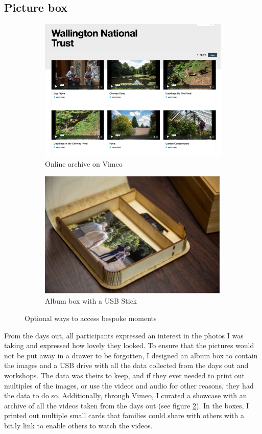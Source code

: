 \subsection{Picture box}
\label{PictureBox}

\begin{figure}[htp]
\centering
\begin{subfigure}{.5\textwidth}
  \centering
  \includegraphics[width=.8\linewidth]{Images/ChapterFour/VimeoWebsite.png}
  \caption{Online archive on Vimeo}
  \label{fig:onlineArchive}
\end{subfigure}%
\begin{subfigure}{.5\textwidth}
  \centering
  \includegraphics[width=.8\linewidth]{Images/ChapterFour/InsidePhotoAlbum.jpg}
  \caption{Album box with a USB Stick}
  \label{fig:AlbumBox}
\end{subfigure}
\caption{Optional ways to access bespoke moments}
\label{fig:OptionalMoments}
\end{figure}

From the days out, all participants expressed an interest in the photos I was taking and expressed how lovely they looked. To ensure that the pictures would not be put away in a drawer to be forgotten, I designed an album box to contain the images and a USB drive with all the data collected from the days out and workshops. The data was theirs to keep, and if they ever needed to print out multiples of the images, or use the videos and audio for other reasons, they had the data to do so. Additionally, through Vimeo, I curated a showcase with an archive of all the videos taken from the days out (see figure \ref{fig:AlbumBox}). In the boxes, I printed out multiple small cards that families could share with others with a bit.ly link to enable others to watch the videos. 

